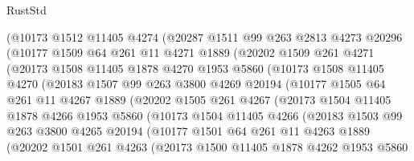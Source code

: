 \begin{lexlean}{RustStd}
\begin{coremodule}
        (@10173
          @1512
          @11405
          @4274
          (@20287
            @1511
            @99
            @263
            @2813
            @4273
            @20296
            (@10177
              @1509
              @64
              @261
              @11
              @4271
              @1889
              (@20202
                @1509
                @261
                @4271
                (@20173
                  @1508
                  @11405
                  @1878
                  @4270
                  @1953
                  @5860
                  (@10173
                    @1508
                    @11405
                    @4270
                    (@20183
                      @1507
                      @99
                      @263
                      @3800
                      @4269
                      @20194
                      (@10177
                        @1505
                        @64
                        @261
                        @11
                        @4267
                        @1889
                        (@20202
                          @1505
                          @261
                          @4267
                          (@20173
                            @1504
                            @11405
                            @1878
                            @4266
                            @1953
                            @5860
                            (@10173
                              @1504
                              @11405
                              @4266
                              (@20183
                                @1503
                                @99
                                @263
                                @3800
                                @4265
                                @20194
                                (@10177
                                  @1501
                                  @64
                                  @261
                                  @11
                                  @4263
                                  @1889
                                  (@20202
                                    @1501
                                    @261
                                    @4263
                                    (@20173
                                      @1500
                                      @11405
                                      @1878
                                      @4262
                                      @1953
                                      @5860

\end{coremodule}
\end{lexlean}
